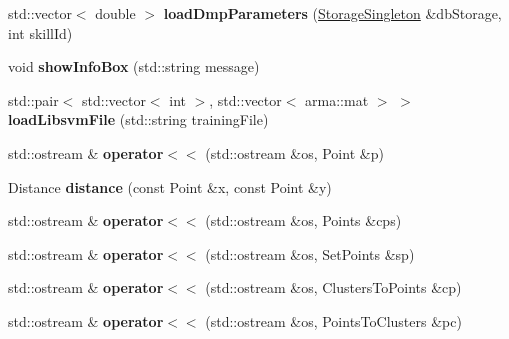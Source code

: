 \begin{DoxyCompactItemize}
\item 
std\+::vector$<$ double $>$ {\bfseries load\+Dmp\+Parameters} (\hyperlink{classkukadu_1_1StorageSingleton}{Storage\+Singleton} \&db\+Storage, int skill\+Id)\hypertarget{namespacekukadu_a4f76458c0cce80d420fd1ad8ccbfa456}{}\label{namespacekukadu_a4f76458c0cce80d420fd1ad8ccbfa456}

\item 
void {\bfseries show\+Info\+Box} (std\+::string message)\hypertarget{namespacekukadu_afdd79ce5ef09244ffe751c0cd8d15cf7}{}\label{namespacekukadu_afdd79ce5ef09244ffe751c0cd8d15cf7}

\item 
std\+::pair$<$ std\+::vector$<$ int $>$, std\+::vector$<$ arma\+::mat $>$ $>$ {\bfseries load\+Libsvm\+File} (std\+::string training\+File)\hypertarget{namespacekukadu_ad61f9dd761429127b2f7f7635f9ae639}{}\label{namespacekukadu_ad61f9dd761429127b2f7f7635f9ae639}

\item 
std\+::ostream \& {\bfseries operator$<$$<$} (std\+::ostream \&os, Point \&p)\hypertarget{namespacekukadu_a9bfeb4f544ea51231d88a65026029571}{}\label{namespacekukadu_a9bfeb4f544ea51231d88a65026029571}

\item 
Distance {\bfseries distance} (const Point \&x, const Point \&y)\hypertarget{namespacekukadu_ada1011866f0dc1fcb9a653bcd5f4816e}{}\label{namespacekukadu_ada1011866f0dc1fcb9a653bcd5f4816e}

\item 
std\+::ostream \& {\bfseries operator$<$$<$} (std\+::ostream \&os, Points \&cps)\hypertarget{namespacekukadu_aa57df45341cdd98a53fa18bc8b452c40}{}\label{namespacekukadu_aa57df45341cdd98a53fa18bc8b452c40}

\item 
std\+::ostream \& {\bfseries operator$<$$<$} (std\+::ostream \&os, Set\+Points \&sp)\hypertarget{namespacekukadu_a49d6376a2a2790e028fa8739c1caabd2}{}\label{namespacekukadu_a49d6376a2a2790e028fa8739c1caabd2}

\item 
std\+::ostream \& {\bfseries operator$<$$<$} (std\+::ostream \&os, Clusters\+To\+Points \&cp)\hypertarget{namespacekukadu_a6e0b1341a7de4c204d43c329bb253fa9}{}\label{namespacekukadu_a6e0b1341a7de4c204d43c329bb253fa9}

\item 
std\+::ostream \& {\bfseries operator$<$$<$} (std\+::ostream \&os, Points\+To\+Clusters \&pc)\hypertarget{namespacekukadu_aa40e9cd0cd568cca2e6717fade91cec2}{}\label{namespacekukadu_aa40e9cd0cd568cca2e6717fade91cec2}


\end{DoxyCompactItemize}
